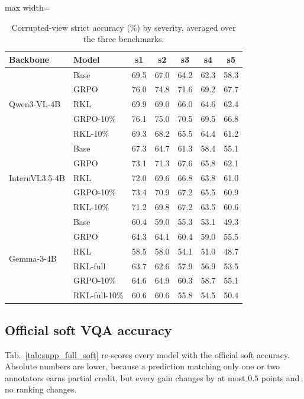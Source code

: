 \begin{table}[t]
\centering\small
\setlength{\tabcolsep}{2.8pt}
\begin{adjustbox}{max width=\columnwidth}
\begin{tabular}{llccccc}
\toprule
Backbone & Model & s1 & s2 & s3 & s4 & s5 \\
\midrule
\multirow{5}{*}{Qwen3-VL-4B} & Base & 69.5 & 67.0 & 64.2 & 62.3 & 58.3 \\
 & GRPO & 76.0 & 74.8 & 71.6 & 69.2 & 67.7 \\
 & RKL & 69.9 & 69.0 & 66.0 & 64.6 & 62.4 \\
 & GRPO-10\% & 76.1 & 75.0 & 70.5 & 69.5 & 66.8 \\
 & RKL-10\% & 69.3 & 68.2 & 65.5 & 64.4 & 61.2 \\
\midrule
\multirow{5}{*}{InternVL3.5-4B} & Base & 67.3 & 64.7 & 61.3 & 58.4 & 55.1 \\
 & GRPO & 73.1 & 71.3 & 67.6 & 65.8 & 62.1 \\
 & RKL & 72.0 & 69.6 & 66.8 & 63.8 & 61.0 \\
 & GRPO-10\% & 73.4 & 70.9 & 67.2 & 65.5 & 60.9 \\
 & RKL-10\% & 71.2 & 69.8 & 67.2 & 63.5 & 60.6 \\
\midrule
\multirow{6}{*}{Gemma-3-4B} & Base & 60.4 & 59.0 & 55.3 & 53.1 & 49.3 \\
 & GRPO & 64.3 & 64.1 & 60.4 & 59.0 & 55.5 \\
 & RKL & 58.5 & 58.0 & 54.1 & 51.0 & 48.7 \\
 & RKL-full & 63.7 & 62.6 & 57.9 & 56.9 & 53.5 \\
 & GRPO-10\% & 64.6 & 64.9 & 60.3 & 58.7 & 55.1 \\
 & RKL-full-10\% & 60.6 & 60.6 & 55.8 & 54.5 & 50.4 \\
\bottomrule
\end{tabular}
\end{adjustbox}
\caption{Corrupted-view strict accuracy (\%) by severity, averaged over the three benchmarks.}
\label{tab:supp_full_sev}
\end{table}

\subsection{Official soft VQA accuracy}
\label{sec:supp_full_soft}

Tab.~\ref{tab:supp_full_soft} re-scores every model with the official soft accuracy. Absolute
numbers are lower, because a prediction matching only one or two annotators earns partial
credit, but every gain changes by at most $0.5$ points and no ranking changes.

